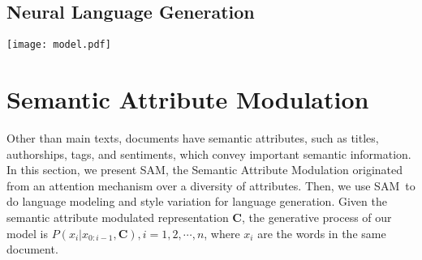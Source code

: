 \documentclass[a4paper]{article}
\newcommand{\method}{\xspace{SAM}}
\newcommand{\wb}[1]{{\color{green}{[WB: #1]}}}
\begin{document}
\subsection{Neural Language Generation}
\fi
\begin{figure*}[htbp]\centering
    {
    \texttt{[image: model.pdf]}
    }
    \vspace{-0.1cm}
    \caption{The \method~architecture}
    \vspace{-0.3cm}
    \label{fig:model detail}
\end{figure*}
\section{Semantic Attribute Modulation}
Other than main texts, documents have semantic attributes, such as titles, authorships, tags, and sentiments, which convey important semantic information.
In this section, we present \method, the Semantic Attribute Modulation originated from an attention mechanism over a diversity of attributes. Then, we use \method~to do language modeling and style variation for language generation.
Given the semantic attribute modulated representation $\mathbf{C}$, the generative process of our model is $P(x_i|x_{0:i-1},\mathbf{C}), i=1,2,\cdots,n$, where $x_{i}$ are the words in the same document.
\end{document}
